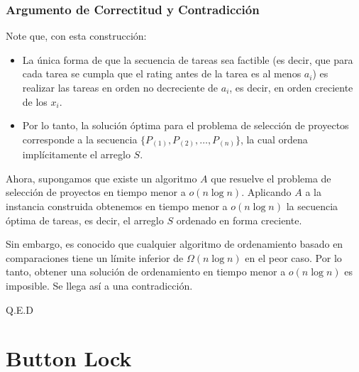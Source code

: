 ﻿\documentclass{article}
\theoremstyle{plain}
\theoremstyle{definition}
\begin{document}
\subsubsection{Argumento de Correctitud y Contradicción}

Note que, con esta construcción:
\begin{itemize}
    \item La única forma de que la secuencia de tareas sea factible (es decir, que para cada tarea se cumpla que el rating antes de la tarea es al menos \(a_i\)) es realizar las tareas en orden no decreciente de \(a_i\), es decir, en orden creciente de los \(x_i\).
    \item Por lo tanto, la solución óptima para el problema de selección de proyectos corresponde a la secuencia \(\{P_{(1)},P_{(2)},\dots,P_{(n)}\}\), la cual ordena implícitamente el arreglo \(S\).
\end{itemize}

Ahora, supongamos que existe un algoritmo \(A\) que resuelve el problema de selección de proyectos en tiempo menor a \(o(n\log n)\). Aplicando \(A\) a la instancia construida obtenemos en tiempo menor a \(o(n\log n)\) la secuencia óptima de tareas, es decir, el arreglo \(S\) ordenado en forma creciente.

Sin embargo, es conocido que cualquier algoritmo de ordenamiento basado en comparaciones tiene un límite inferior de \(\Omega(n\log n)\) en el peor caso. Por lo tanto, obtener una solución de ordenamiento en tiempo menor a \(o(n\log n)\) es imposible. Se llega así a una contradicción.

Q.E.D

\section{Button Lock}
\end{document}
